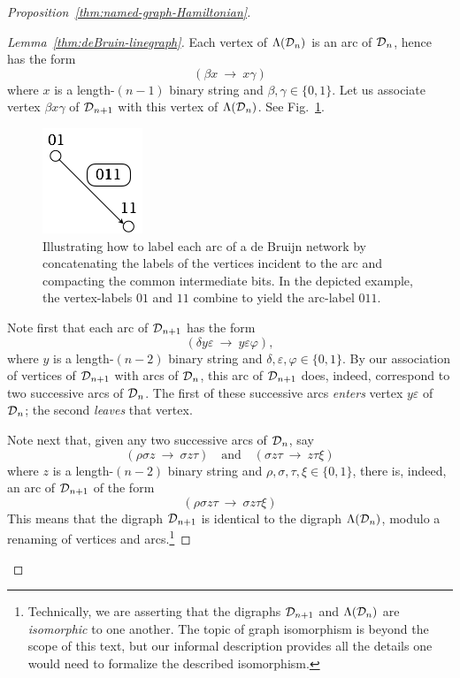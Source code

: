 \begin{proof}[Proposition~\ref{thm:named-graph-Hamiltonian}]
\begin{proof}[Lemma~\ref{thm:deBruin-linegraph}]
Each vertex of $\Lambda(\mbox{$\cal D$}_n)$ is an arc of $\mbox{$\cal D$}_n$, hence has the form
\[ (\beta x \ \rightarrow \ x \gamma) \]
where $x$ is a length-$(n-1)$ binary string and $\beta, \gamma \in \{0,1\}$.  Let us 
associate vertex $\beta x \gamma$ of $\mbox{$\cal D$}_{n+1}$ with this vertex of $\Lambda(\mbox{$\cal D$}_n)$.
See Fig.~\ref{fig:dBlabelEdge-App}.
\begin{figure}[hbt]
\begin{center}
       \includegraphics[scale=0.5]{FiguresGraph/dBlabelEdge}
\caption{Illustrating how to label each arc of a de Bruijn network by concatenating the labels
of the vertices incident to the arc and compacting the common intermediate bits.  In the 
depicted example, the vertex-labels $01$ and $11$ combine to yield the arc-label $011$.}
  \label{fig:dBlabelEdge-App}
\end{center}
\end{figure}

\smallskip

Note first that each arc of $\mbox{$\cal D$}_{n+1}$ has the form
\[ (\delta y \varepsilon \ \rightarrow \ y \varepsilon \varphi), \]
where $y$ is a length-$(n-2)$ binary string and $\delta, \varepsilon, \varphi \in \{0,1\}$.  
By our association of vertices of $\mbox{$\cal D$}_{n+1}$ with arcs of $\mbox{$\cal D$}_n$, this arc of $\mbox{$\cal D$}_{n+1}$ does, 
indeed, correspond to two successive arcs of $\mbox{$\cal D$}_n$.   The first of these successive arcs
{\em enters} vertex $y \varepsilon$ of $\mbox{$\cal D$}_n$; the second {\em leaves} that vertex.

Note next that, given any two successive arcs of $\mbox{$\cal D$}_n$, say
\[
(\rho \sigma z \ \rightarrow \ \sigma z \tau) \ \ \ \mbox { and } \ \ \
(\sigma z \tau \ \rightarrow \  z \tau \xi)
\]
where $z$ is a length-$(n-2)$ binary string and $\rho, \sigma, \tau,
\xi \in \{0,1\}$, there is, indeed, an arc of $\mbox{$\cal D$}_{n+1}$ of the form
\[ (\rho \sigma z \tau \ \rightarrow \ \sigma z \tau \xi) \]
This means that the digraph $\mbox{$\cal D$}_{n+1}$ is identical to the digraph
$\Lambda(\mbox{$\cal D$}_n)$, modulo a renaming of vertices and arcs.\footnote{Technically,
  we are asserting that the digraphs ${\cal D}_{n+1}$ and ${\Lambda}({\cal D}_n)$ 
  are {\it isomorphic} to one another.  The topic of graph isomorphism is beyond the 
  scope of this text, but our informal description provides all the details one would 
  need to formalize the described isomorphism.}


\end{proof}
\end{proof}
